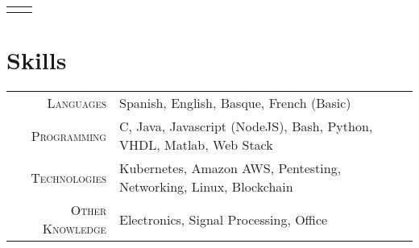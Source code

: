 \documentclass[a4paper,10pt]{article}
\begin{document}
\begin{tabular}{p{3.2cm}p{13.1cm}}
\vspace{-.2in}
\end{tabular}

 \vspace{-.3in}

 \section{Skills}
\begin{tabular}{r|l}
\textsc{Languages} & Spanish, English, Basque, French (Basic) \\
\textsc{Programming} & C, Java, Javascript (NodeJS), Bash, Python, VHDL, Matlab, Web Stack \\
\textsc{Technologies} & Kubernetes, Amazon AWS, Pentesting, Networking, Linux, Blockchain  \\
\textsc{Other Knowledge} & Electronics, Signal Processing, Office \\
\end{tabular}


 
\end{document}
